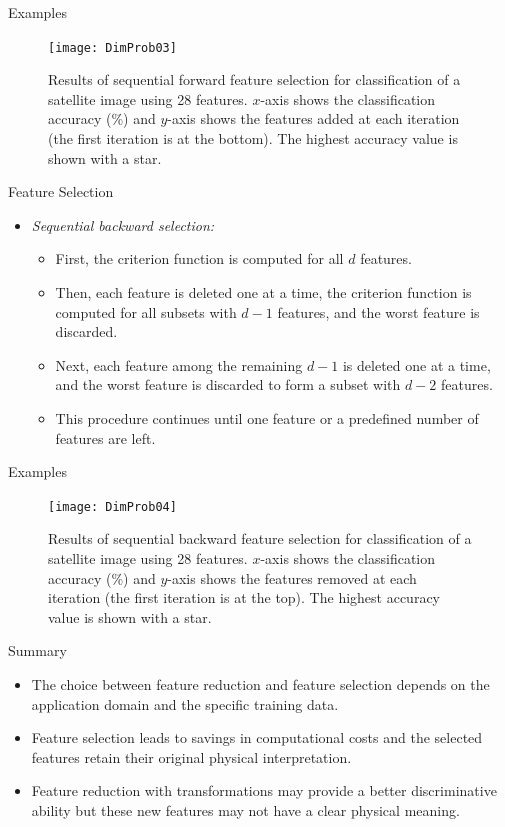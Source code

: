 \begin{frame}{Examples}
\begin{figure}
\texttt{[image: DimProb03]}
\caption{Results of sequential forward feature selection for classification of a satellite image using 28 features. $x$-axis shows the classification accuracy (\%) and $y$-axis shows the features added at each iteration (the first iteration is
at the bottom). The highest accuracy value is shown with a star.}
\end{figure}
\end{frame}

\begin{frame}{Feature Selection}
\begin{itemize}
\item \textit{\color{mycolor2}Sequential backward selection:}
\begin{itemize}
\item First, the criterion function is computed for all $d$ features.
\item Then, each feature is deleted one at a time, the criterion
function is computed for all subsets with $d - 1$ features, and
the worst feature is discarded.
\item Next, each feature among the remaining $d - 1$ is deleted one
at a time, and the worst feature is discarded to form a subset
with $d - 2$ features.
\item This procedure continues until one feature or a predefined
number of features are left.
\end{itemize}
\end{itemize}
\end{frame}


\begin{frame}{Examples}
\begin{figure}
\texttt{[image: DimProb04]}
\caption{Results of sequential backward feature selection for classification of a satellite image using 28 features. $x$-axis shows the classification accuracy (\%) and $y$-axis shows the features removed at each iteration (the first iteration is
at the top). The highest accuracy value is shown with a star.}
\end{figure}
\end{frame}

\begin{frame}{Summary}
\begin{itemize}
\item The choice between feature reduction and feature selection
depends on the application domain and the specific training
data.
\item Feature selection leads to savings in computational costs
and the selected features retain their original physical
interpretation.
\item Feature reduction with transformations may provide a better
discriminative ability but these new features may not have a
clear physical meaning.
\end{itemize}
\end{frame}

